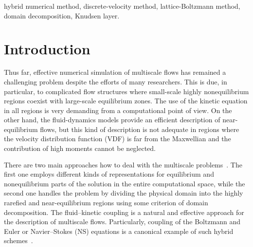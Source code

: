 \documentclass{elsarticle} %
\begin{document}
\begin{frontmatter}
\begin{abstract}
\end{abstract}

\begin{keyword}
hybrid numerical method,
discrete-velocity method,
lattice-Boltzmann method,
domain decomposition,
Knudsen layer.
\end{keyword}

\end{frontmatter}

\tableofcontents

\section{Introduction}\label{sec:intro}

Thus far, effective numerical simulation of multiscale flows has remained a challenging problem despite the efforts of many researchers.
This is due, in particular, to complicated flow structures where small-scale highly nonequilibrium regions
coexist with large-scale equilibrium zones.
The use of the kinetic equation in all regions is very demanding from a computational point of view.
On the other hand, the fluid-dynamics models provide an efficient description of near-equilibrium flows,
but this kind of description is not adequate in regions where the velocity distribution function (VDF)
is far from the Maxwellian and the contribution of high moments cannot be neglected.



There are two main approaches how to deal with the multiscale problems~\cite{Dimarco2014}.
The first one employs different kinds of representations for equilibrium and nonequilibrium parts of the solution
in the entire computational space, while the second one handles the problem by dividing the physical domain
into the highly rarefied and near-equilibrium regions using some criterion of domain decomposition.
The fluid--kinetic coupling is a natural and effective approach for the description of multiscale flows.
Particularly, coupling of the Boltzmann and Euler or Navier--Stokes (NS) equations
is a canonical example of such hybrid schemes~\cite{Bourgat1996, Tallec1997}.
\end{document}
